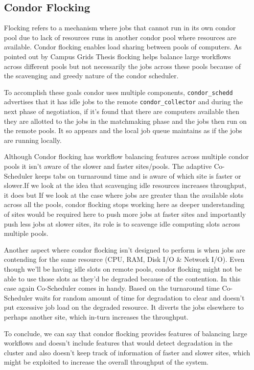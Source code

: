 \documentclass[ms,electronic,double]{nuthesis}
\begin{document}
\subsection{Condor Flocking}
Flocking refers to a mechanism where jobs that cannot run in its own condor pool 
due to lack of resources runs in another condor pool where resources are 
available. Condor flocking enables load sharing between pools of computers. As 
pointed out by Campus Grids Thesis\cite{derekThesis} flocking helps balance large workflows across different pools but not 
necessarily the jobs across these pools because of the scavenging and greedy nature 
of the condor scheduler.

To accomplish these goals condor uses multiple components, 
\texttt{condor\_schedd} advertises that it has idle jobs to the remote \texttt{condor\_collector} 
and during the next phase of negotiation, if it's found that there are computers 
available then they are allotted to the jobs in the matchmaking phase and the 
jobs then run on the remote pools. It so appears and the local job queue maintains as if 
the jobs are running locally. 

Although Condor flocking has workflow balancing features across multiple condor 
pools it isn't aware of the slower and faster sites/pools. The adaptive Co-Scheduler 
keeps tabs on turnaround time and is aware of which site is faster or slower.If we 
look at the idea that scavenging idle resources increases throughput, it does 
but If we look at the case where jobs are greater than the available slots 
across all the pools, condor flocking stops working here as deeper understanding of sites
would be required here to push more jobs at faster sites and importantly push less jobs
at slower sites, its role is to scavenge idle computing slots across multiple pools. 

Another aspect where condor flocking isn't designed to perform is when jobs are 
contending for the same resource (CPU, RAM, Disk I/O \& Network I/O). Even though we'll be 
having idle slots on remote pools, condor flocking might not be able to use those 
slots as they'd be degraded because of the contention. In this case again 
Co-Scheduler comes in handy. Based on the turnaround time Co-Scheduler waits for random 
amount of time for degradation to clear and doesn't put excessive job load on the 
degraded resource. It diverts the jobs elsewhere to perhaps another site, which in-turn increases the 
throughput.

To conclude, we can say that condor flocking provides features of balancing 
large workflows and doesn't include features that would detect degradation in 
the cluster and also doesn't keep track of information of faster and 
slower sites, which might be exploited to increase the overall throughput of the system. 
\end{document}
